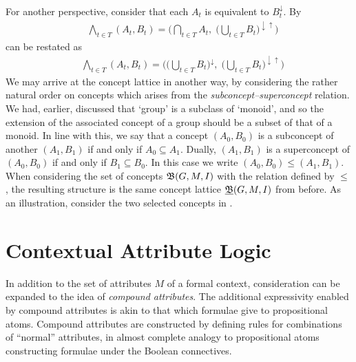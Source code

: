 For another perspective, consider that each $A_{t}$ is equivalent to $B_{t}^{\downarrow}$. By 
\begin{align*}
   & \underset{t \in T}\bigwedge (A_{t}, B_{t}) = \Big( \underset{t \in T}\bigcap A_{t}, \; \big(\underset{t \in T}\bigcup B_{t}\big)^{\downarrow \uparrow}\Big)
\end{align*}
can be restated as
\begin{align*}
   & \underset{t \in T}\bigwedge (A_{t}, B_{t}) = \Big(\big(\underset{t \in T}\bigcup B_{t}\big)^{\downarrow}, \; \big(\underset{t \in T}\bigcup B_{t}\big)^{\downarrow \uparrow}\Big)
\end{align*}
We may arrive at the concept lattice in another way, by considering the rather natural order on concepts which arises from the \textit{subconcept--superconcept}
relation. We had, earlier, discussed that `group' is a subclass of `monoid', and so the extension of the associated concept of a group
should be a subset of that of a monoid. In line with this, we say that a concept $(A_{0},B_{0})$ is a subconcept of another $(A_{1},B_{1})$
if and only if $A_{0}\subseteq A_{1}$. Dually, $(A_{1},B_{1})$ is a superconcept of $(A_{0},B_{0})$ if and only if $B_{1}\subseteq B_{0}$. In
this case we write $(A_{0},B_{0}) \leq (A_{1},B_{1})$. When considering the set of concepts ${\mathfrak B} (G,M,\mathrel{I})$ with the relation defined by $\leq$, the
resulting structure is the same concept lattice $\underline{{\mathfrak B}} (G,M,\mathrel{I})$ from before. As an illustration, consider the two selected concepts in .


\section{Contextual Attribute Logic}
\label{section:contextual-attribute-logic}

In addition to the set of attributes $M$ of a formal context, consideration can be expanded to the idea of \textit{compound attributes}. The
additional expressivity enabled by compound attributes is akin to that which formulae give to propositional atoms. Compound attributes are constructed
by defining rules for combinations of ``normal'' attributes, in almost complete analogy to propositional atoms constructing formulae under
the Boolean connectives.

